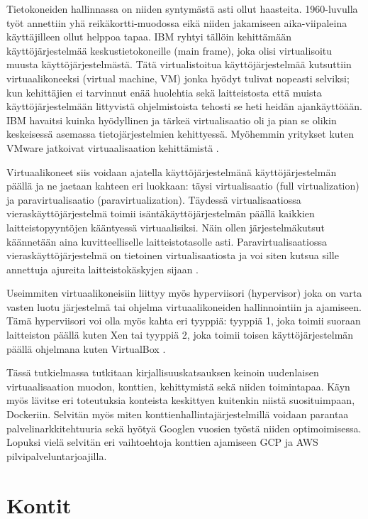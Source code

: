 \documentclass[finnish,gradu]{tktltiki3}
\begin{document}
Tietokoneiden hallinnassa on niiden syntymästä asti ollut haasteita. 1960-luvulla työt annettiin yhä reikäkortti-muodossa eikä niiden jakamiseen aika-viipaleina käyttäjilleen ollut helppoa tapaa. IBM ryhtyi tällöin kehittämään käyttöjärjestelmää keskustietokoneille (main frame), joka olisi virtualisoitu muusta käyttöjärjestelmästä. Tätä virtualistoitua käyttöjärjestelmää kutsuttiin virtuaalikoneeksi (virtual machine, VM) jonka hyödyt tulivat nopeasti selviksi; kun kehittäjien ei tarvinnut enää huolehtia sekä laitteistosta että muista käyttöjärjestelmään littyvistä ohjelmistoista tehosti se heti heidän ajankäyttöään. IBM havaitsi kuinka hyödyllinen ja tärkeä virtualisaatio oli ja pian se olikin keskeisessä asemassa tietojärjestelmien kehittyessä. Myöhemmin yritykset kuten VMware jatkoivat virtuaalisaation kehittämistä \cite{ibm-looks-to-future}.

Virtuaalikoneet siis voidaan ajatella käyttöjärjestelmänä käyttöjärjestelmän päällä ja ne jaetaan kahteen eri luokkaan: täysi virtualisaatio (full virtualization) ja paravirtualisaatio (paravirtualization). Täydessä virtualisaatiossa vieraskäyttöjärjestelmä toimii isäntäkäyttöjärjestelmän päällä kaikkien laitteistopyyntöjen kääntyessä virtuaalisiksi. Näin ollen järjestelmäkutsut käännetään aina kuvitteelliselle laitteistotasolle asti. Paravirtualisaatiossa vieraskäyttöjärjestelmä on tietoinen virtualisaatiosta ja voi siten kutsua sille annettuja ajureita laitteistokäskyjen sijaan \cite{xen-paravirtualization}.

Useimmiten virtuaalikoneisiin liittyy myös hyperviisori (hypervisor) joka on varta vasten luotu järjestelmä tai ohjelma virtuaalikoneiden hallinnointiin ja ajamiseen. Tämä hyperviisori voi olla myös kahta eri tyyppiä: tyyppiä 1, joka toimii suoraan laitteiston päällä kuten Xen tai tyyppiä 2, joka toimii toisen käyttöjärjestelmän päällä ohjelmana kuten VirtualBox \cite{hypervisor}.

Tässä tutkielmassa tutkitaan kirjallisuuskatsauksen keinoin uudenlaisen virtuaalisaation muodon, konttien, kehittymistä sekä niiden toimintapaa. Käyn myös lävitse eri toteutuksia konteista keskittyen kuitenkin niistä suosituimpaan, Dockeriin. Selvitän myös miten konttienhallintajärjestelmillä voidaan parantaa palvelinarkkitehtuuria sekä hyötyä Googlen vuosien työstä niiden optimoimisessa. Lopuksi vielä selvitän eri vaihtoehtoja konttien ajamiseen GCP ja AWS pilvipalveluntarjoajilla.

\section{Kontit}
\end{document}
